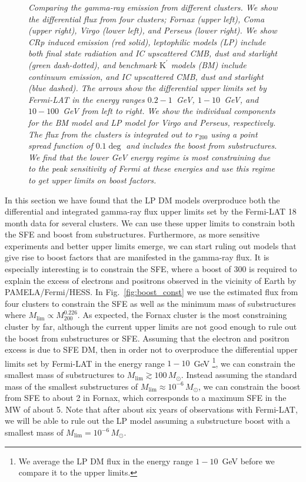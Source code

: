 \documentclass[10pt,aps,pra,reprint,amsmath,amsfonts,amssymb,showpacs,nofootinbib,floatfix]{revtex4-1}
\def\del#1{{}}
\newcommand{\rmn}{\mathrm}
\newcommand{\msun}{M_\odot}
\newcommand{\Kp}{\rmn{K}^\prime}
\newcommand{\rvir}{r_{200}}
\newcommand{\mvir}{M_{200}}
\begin{document}
\begin{figure}
\begin{minipage}{2.0\columnwidth}
\caption{\it Comparing the gamma-ray emission from different
  clusters. We show the differential flux from four clusters; Fornax
  (upper left), Coma (upper right), Virgo (lower left), and Perseus
  (lower right). We show CRp induced emission (red solid), leptophilic
  models (LP) include both final state radiation and IC upscattered
  CMB, dust and starlight (green dash-dotted), and benchmark $\Kp$
  models (BM) include continuum emission, and IC upscattered CMB, dust
  and starlight (blue dashed). The arrows show the differential upper
  limits set by Fermi-LAT in the energy ranges $0.2-1$~GeV,
  $1-10$~GeV, and $10-100$~GeV from left to right. We show the
  individual components for the BM model and LP model for Virgo and
  Perseus, respectively. The flux from the clusters is integrated out
  to $\rvir$ using a point spread function of $0.1\deg$ and includes
  the boost from substructures. We find that the lower GeV energy
  regime is most constraining due to the peak sensitivity of Fermi at
  these energies and use this regime to get upper limits on boost
  factors.}
 \label{fig:clu_comp}
\end{minipage}
\end{figure}

\del{
peak sensitivity of Fermi at these energies due to a combination of effective area background and source spectra...}

In this section we have found that the LP DM models overproduce both
the differential and integrated gamma-ray flux upper limits set by the
Fermi-LAT 18 month data for several clusters. We can use these upper
limits to constrain both the SFE and boost from
substructures. Furthermore, as more sensitive experiments and better
upper limits emerge, we can start ruling out models that give rise to
boost factors that are manifested in the gamma-ray flux. It is
especially interesting is to constrain the SFE, where a boost of 300
is required to explain the excess of electrons and positrons observed
in the vicinity of Earth by PAMELA/Fermi/HESS. In
Fig.~\ref{fig:boost_const} we use the estimated flux from four
clusters to constrain the SFE as well as the minimum mass of
substructures where $M_\rmn{lim}\propto\mvir^{0.226}$. As expected,
the Fornax cluster is the most constraining cluster by far, although
the current upper limits are not good enough to rule out the boost
from substructures or SFE. Assuming that the electron and positron
excess is due to SFE DM, then in order not to overproduce the
differential upper limits set by Fermi-LAT in the energy range
$1-10$~GeV \footnote{We average the LP DM flux in the energy range
  $1-10$~GeV before we compare it to the upper limits.}, we can
constrain the smallest mass of substructures to $M_\rmn{lim}\gtrsim
100\,\msun$. Instead assuming the standard mass of the smallest
substructures of $M_\rmn{lim}\approx 10^{-6}\,\msun$, we can constrain
the boost from SFE to about 2 in Fornax, which corresponds to a
maximum SFE in the MW of about 5. Note that after about six years of
observations with Fermi-LAT, we will be able to rule out the LP model
assuming a substructure boost with a smallest mass of $M_\rmn{lim} =
10^{-6}\,\msun$.
\end{document}
